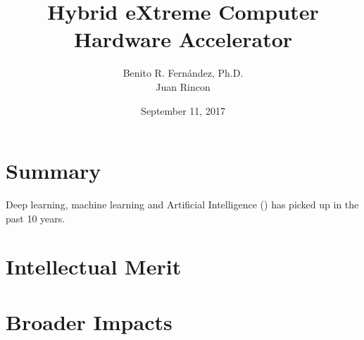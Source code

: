 \documentclass[12pt]{article}
\author{
    Benito R. Fern\'andez, Ph.D.\\
    Juan Rincon
    }
\title{\huge{Hybrid eXtreme Computer \cool{HxC}}\\
Hardware Accelerator}
\date{September 11, 2017}
\begin{document}
	\maketitle
    \section*{Summary}
      Deep learning, machine learning and Artificial Intelligence () has picked up in the past 10 years. 
    \section*{Intellectual Merit}
    \section*{Broader Impacts}
    
    
            
\end{document}
